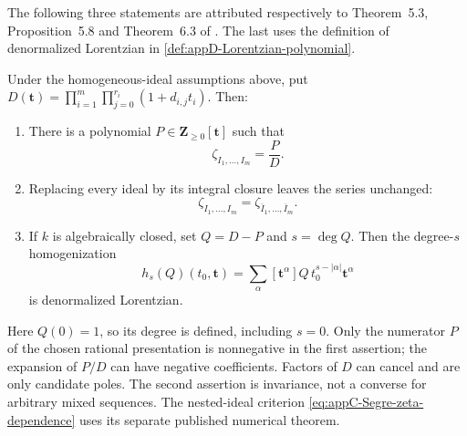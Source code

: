 The following three statements are attributed respectively to
Theorem~5.3, Proposition~5.8 and Theorem~6.3 of
\cite{CidRuiz26MixedSegreV2}. The last uses the definition of
denormalized Lorentzian in \cref{def:appD-Lorentzian-polynomial}.
\begin{theorem}
\label{thm:appC-mixed-zeta-import}
Under the homogeneous-ideal assumptions above, put
$D(\mathbf t)=\prod_{i=1}^m\prod_{j=0}^{r_i}(1+d_{i,j}t_i)$.
Then:
\begin{enumerate}
\item There is a polynomial $P\in\mathbf Z_{\geq0}[\mathbf t]$
      such that
      \[
       \zeta_{I_1,\ldots,I_m}=\frac{P}{D}.
       \tag{C.38}\label{eq:appC-mixed-zeta-rationality}
      \]
\item Replacing every ideal by its integral closure leaves the
      series unchanged:
      \[
       \zeta_{I_1,\ldots,I_m}
        =\zeta_{\overline I_1,\ldots,\overline I_m}.
       \tag{C.39}\label{eq:appC-mixed-zeta-integral-closure}
      \]
\item If $k$ is algebraically closed, set $Q=D-P$ and $s=\deg Q$.
      Then the degree-$s$ homogenization
      \[
       h_s(Q)(t_0,\mathbf t)
          =\sum_\alpha [\mathbf t^\alpha]Q\,
                         t_0^{s-|\alpha|}\mathbf t^\alpha
       \tag{C.40}\label{eq:appC-mixed-zeta-modified-numerator}
      \]
      is denormalized Lorentzian.
\end{enumerate}
\end{theorem}

Here $Q(0)=1$, so its degree is defined, including $s=0$.
Only the numerator $P$ of the chosen rational presentation is
nonnegative in the first assertion; the expansion of $P/D$
can have negative coefficients. Factors of $D$ can cancel and
are only candidate poles. The second assertion is invariance,
not a converse for arbitrary mixed sequences. The nested-ideal
criterion \eqref{eq:appC-Segre-zeta-dependence} uses its separate
published numerical theorem.

